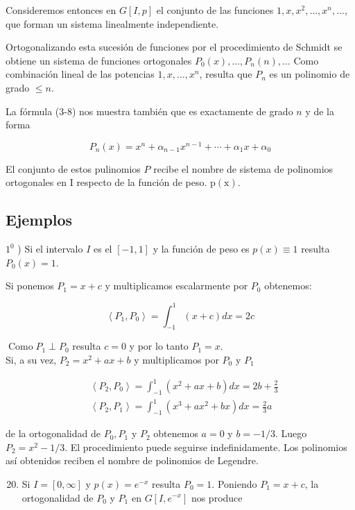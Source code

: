 \documentclass[10pt]{article}
\theoremstyle{plain}
\theoremstyle{definition}
\theoremstyle{remark}
\begin{document}
Consideremos entonces en $G[I, p]$ el conjunto de las funciones $1, x, x^{2}, \ldots, x^{n}, \ldots$, que forman un sistema linealmente independiente.

Ortogonalizando esta sucesión de funciones por el procedimiento de Schmidt se obtiene un sistema de funciones ortogonales $P_{0}(x), \ldots, P_{n}(n), \ldots$ Como combinación lineal de las potencias $1, x, \ldots, x^{n}$, resulta que $P_{n}$ es un polinomio de grado $\leqslant n$.

La fórmula (3-8) nos muestra también que es exactamente de grado $n$ y de la forma

$$
P_{n}(x)=x^{n}+\alpha_{n-1} x^{n-1}+\cdots+\alpha_{1} x+\alpha_{0}
$$

El conjunto de estos pulinomios $P$ recibe el nombre de sistema de polinomios ortogonales en I respecto de la función de peso. $\mathrm{p}(\mathrm{x})$.

\subsection{Ejemplos}
$1^{0}$ ) Si el intervalo $I$ es el $[-1,1]$ y la función de peso es $p(x) \equiv 1$ resulta $P_{0}(x)=1$.

Si ponemos $P_{1}=x+c$ y multiplicamos escalarmente por $P_{0}$ obtenemos:

$$
\left\langle P_{1}, P_{0}\right\rangle=\int_{-1}^{1}(x+c) d x=2 c
$$

$\operatorname{Como} P_{1} \perp P_{0}$ resulta $c=0$ y por lo tanto $P_{1}=x$.\\
Si, a su vez, $P_{2}=x^{2}+a x+b$ y multiplicamos por $P_{0}$ y $P_{1}$

$$
\begin{aligned}
& \left\langle P_{2}, P_{0}\right\rangle=\int_{-1}^{1}\left(x^{2}+a x+b\right) d x=2 b+\frac{2}{3} \\
& \left\langle P_{2}, P_{1}\right\rangle=\int_{-1}^{1}\left(x^{3}+a x^{2}+b x\right) d x=\frac{2}{3} a
\end{aligned}
$$

de la ortogonalidad de $P_{0}, P_{1}$ y $P_{2}$ obtenemos $a=0$ y $b=-1 / 3$. Luego $P_{2}=x^{2}-1 / 3$. El procedimiento puede seguirse indefinidamente. Los polinomios así obtenidos reciben el nombre de polinomios de Legendre.


\begin{enumerate}
  \setcounter{enumi}{19}
  \item Si $I=[0, \infty]$ y $p(x)=e^{-x}$ resulta $P_{0}=1$. Poniendo $P_{1}=x+c$, la ortogonalidad de $P_{0}$ y $P_{1}$ en $G\left[I, e^{-x}\right]$ nos produce
\end{enumerate}
\end{document}
